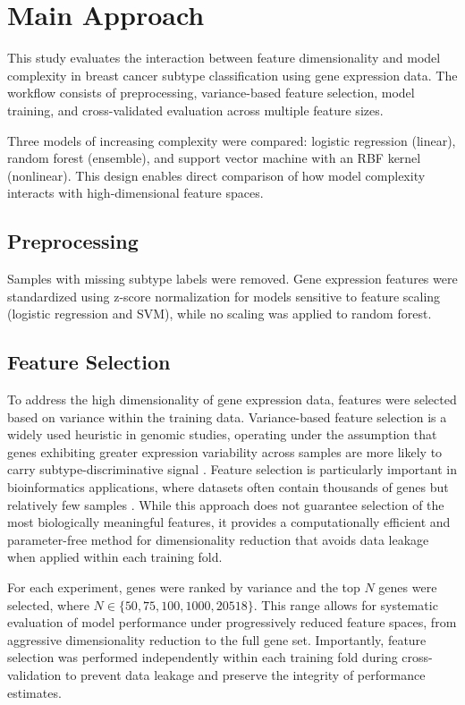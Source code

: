 \documentclass[10pt,twocolumn,letterpaper]{article}
\begin{document}
\FloatBarrier
\section{Main Approach}

This study evaluates the interaction between feature dimensionality and model complexity in breast cancer subtype classification using gene expression data. The workflow consists of preprocessing, variance-based feature selection, model training, and cross-validated evaluation across multiple feature sizes.

Three models of increasing complexity were compared: logistic regression (linear), random forest (ensemble), and support vector machine with an RBF kernel (nonlinear). This design enables direct comparison of how model complexity interacts with high-dimensional feature spaces.

\subsection{Preprocessing}

Samples with missing subtype labels were removed. Gene expression features were standardized using z-score normalization for models sensitive to feature scaling (logistic regression and SVM), while no scaling was applied to random forest.

\subsection{Feature Selection}

To address the high dimensionality of gene expression data, features were selected based on variance within the training data. Variance-based feature selection is a widely used heuristic in genomic studies, operating under the assumption that genes exhibiting greater expression variability across samples are more likely to carry subtype-discriminative signal \cite{sanz2017, guyon2003}. Feature selection is particularly important in bioinformatics applications, where datasets often contain thousands of genes but relatively few samples \cite{saeys2007}. While this approach does not guarantee selection of the most biologically meaningful features, it provides a computationally efficient and parameter-free method for dimensionality reduction that avoids data leakage when applied within each training fold.

For each experiment, genes were ranked by variance and the top $N$ genes were selected, where $N \in \{50, 75, 100, 1000, 20518\}$. This range allows for systematic evaluation of model performance under progressively reduced feature spaces, from aggressive dimensionality reduction to the full gene set. Importantly, feature selection was performed independently within each training fold during cross-validation to prevent data leakage and preserve the integrity of performance estimates.
\end{document}
